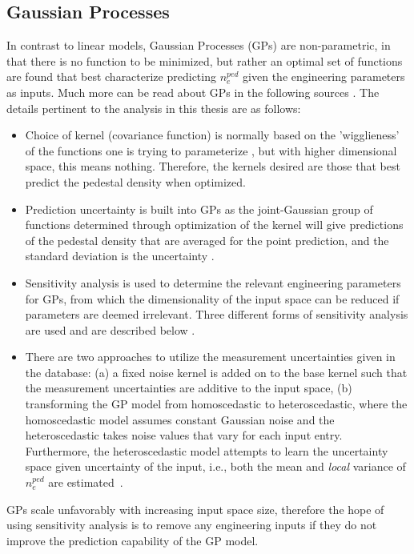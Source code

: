 \documentclass[a4paper, twoside, final, 12pt]{article}
\begin{document}
\subsection{Gaussian Processes}
In contrast to linear models, Gaussian Processes (GPs) are non-parametric, in that there is no function to be minimized, but rather an optimal set of functions are found that best characterize predicting $n_e^{ped}$ given the engineering parameters as inputs.
Much more can be read about GPs in the following sources \cite{gortler2019a, Rasmussen2004, vapnik95}.
The details pertinent to the analysis in this thesis are as follows:
\begin{itemize}
	\item Choice of kernel (covariance function) is normally based on the 'wigglieness' of the functions one is trying to parameterize \cite{cov-matrix-maths}, but with higher dimensional space, this means nothing. Therefore, the kernels desired are those that best predict the pedestal density when optimized.
	\item Prediction uncertainty is built into GPs as the joint-Gaussian group of functions determined through optimization of the kernel will give predictions of the pedestal density that are averaged for the point prediction, and the standard deviation is the uncertainty \cite{Rasmussen2004}. 
	\item Sensitivity analysis is used to determine the relevant engineering parameters for GPs, from which the dimensionality of the input space can be reduced if parameters are deemed irrelevant. Three different forms of sensitivity analysis are used and are described below \cite{pmlr-v89-paananen19a}. 
	\item There are two approaches to utilize the measurement uncertainties given in the database: (a) a fixed noise kernel is added on to the base kernel such that the measurement uncertainties are additive to the input space, (b) transforming the GP model from homoscedastic to heteroscedastic, where the homoscedastic model assumes constant Gaussian noise and the heteroscedastic takes noise values that vary for each input entry. Furthermore, the heteroscedastic model attempts to learn the uncertainty space given uncertainty of the input, i.e., both the mean and \textit{local} variance of $n_e^{ped}$ are estimated~\cite{heteroscedastic}.   
\end{itemize}

GPs scale unfavorably with increasing input space size, therefore the hope of using sensitivity analysis is to remove any engineering inputs if they do not improve the prediction capability of the GP model.
\end{document}
